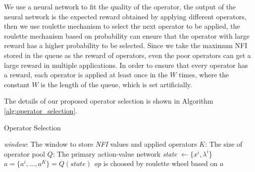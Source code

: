\documentclass[journal]{IEEEtran}
\begin{document}
We use a neural network to fit the quality of the operator, the output of the neural network is the expected reward obtained by applying different operators, then we use roulette mechanism to select the next operator to be applied, the roulette mechanism based on probability can ensure that the operator with large reward has a higher probability to be selected.
Since we take the maximum NFI stored in the queue as the reward of operators, even the poor operators can get a large reward in multiple applications. In order to ensure that every operator has a reward, each operator is applied at least once in the $W$ times, where the constant $W$ is the length of the queue, which is set artificially.

The details of our proposed operator selection is shown in Algorithm \ref{alg:operator_selection}.

\begin{algorithm}
    \label{alg:operator_selection}
    \caption{Operator Selection}
    \small
    \textit{window}: The window to store \textit{NFI} values and applied operators\;  %
    $K$: The size of operator pool\;
    $Q$: The primary action-value network\;
    \textit{state} $\leftarrow \{x^i, \lambda^i$\}\;
    $a = \{ a^i, \dots , a^K \} = Q(\textit{state})$\;
    \textit{op} is choosed by roulette wheel based on $a$\;
    \;
\end{algorithm}
\end{document}
